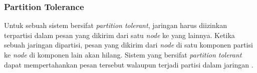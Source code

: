 \subsubsection{Partition Tolerance}

Untuk sebuah sistem bersifat \textit{partition tolerant}, jaringan harus diizinkan terpartisi dalam pesan yang dikirim dari satu \textit{node} ke yang lainnya. Ketika sebuah jaringan dipartisi, pesan yang dikirim dari \textit{node} di satu komponen partisi ke \textit{node} di komponen lain akan hilang. Sistem yang bersifat \textit{partition tolerant} dapat mempertahankan pesan tersebut walaupun terjadi partisi dalam jaringan \parencite{gilbert2002brewer}.
